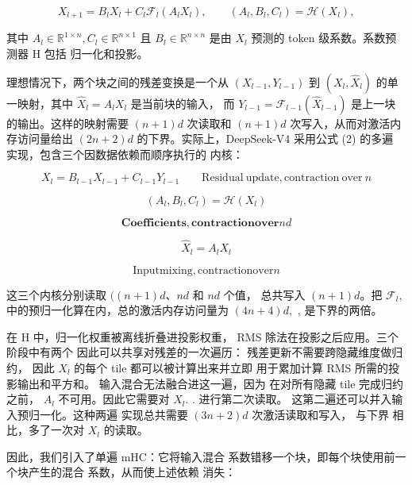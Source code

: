 \documentclass[
  10
]{article}
\begin{document}
\[
X _ { l + 1 } = B _ { l } X _ { l } + C _ { l } { \mathcal { F } } _ { l } ( A _ { l } X _ { l } ) , \qquad ( A _ { l } , B _ { l } , C _ { l } ) = { \mathcal { H } } ( X _ { l } ) ,\tag{2}
\]

其中
\(A _ { l } \in \mathbb { R } ^ { 1 \times n } , C _ { l } \in \mathbb { R } ^ { n \times 1 }\)
且 \(B _ { l } \in \mathbb { R } ^ { n \times n }\) 是由 $X_l$ 预测的
token 级系数。系数预测器 H 包括
归一化和投影。

理想情况下，两个块之间的残差变换是一个从
\(\left( X _ { l - 1 } , Y _ { l - 1 } \right)\) 到
\(( X _ { l } , \hat { X } _ { l } )\) 的单一映射，其中
\(\hat { X } _ { l } = A _ { l } X _ { l }\) 是当前块的输入，
而
\(Y _ { l - 1 } = \mathcal { F } _ { l - 1 } ( \hat { X } _ { l - 1 } )\)
是上一块的输出。这样的映射需要 $(n + 1)d$ 次读取和
\(( n + 1 ) d\) 次写入，从而对激活内存访问量给出
\(( 2 n + 2 ) d\) 的下界。实际上，DeepSeek-V4 采用公式 (2) 的多遍
实现，包含三个因数据依赖而顺序执行的
内核：

\[
X _ { l } = B _ { l - 1 } X _ { l - 1 } + C _ { l - 1 } Y _ { l - 1 } \qquad { \mathrm { R e s i d u a l ~ u p d a t e , c o n t r a c t i o n ~ o v e r ~ } } n\tag{3}
\]

\[
\left( A _ { l } , B _ { l } , C _ { l } \right) = \mathcal { H } ( X _ { l } )
\]

\[
\mathbf { C o e f f i c i e n t s , c o n t r a c t i o n o v e r } n d\tag{4}
\]

\[
\hat { X } _ { l } = A _ { l } X _ { l }
\]

\[
{ \mathrm { I n p u t m i x i n g } } , { \mathrm { c o n t r a c t i o n o v e r } } n\tag{5}
\]

这三个内核分别读取 $((n + 1)d$、$nd$ 和 $nd$ 个值，
总共写入 \(( n + 1 ) d\)。把
\(\mathcal { F } _ { l } ,\) 中的预归一化算在内，总的激活内存访问量为
\(( 4 n + 4 ) d ,\) , 是下界的两倍。

在 H 中，归一化权重被离线折叠进投影权重，
RMS 除法在投影之后应用。三个阶段中有两个
因此可以共享对残差的一次遍历：
残差更新不需要跨隐藏维度做归约，
因此 \(X _ { l }\) 的每个 tile 都可以被计算出来并立即
用于累加计算 RMS 所需的投影输出和平方和。
输入混合无法融合进这一遍，因为
在对所有隐藏 tile 完成归约之前，
\(A _ { l }\) 不可用。因此它需要对 \(X _ { l } .\) . 进行第二次读取。
这第二遍还可以并入输入预归一化。这种两遍
实现总共需要 $(3n + 2)d$ 次激活读取和写入，
与下界
相比，多了一次对 \(X _ { l }\) 的读取。




因此，我们引入了单遍 mHC：它将输入混合
系数错移一个块，即每个块使用前一个块产生的混合
系数，从而使上述依赖
消失：
\end{document}
